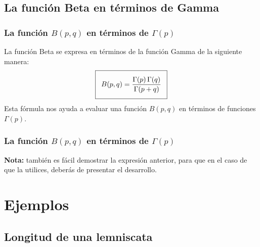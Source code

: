 \documentclass[12pt]{beamer}
\begin{document}
\subsection{La función Beta en términos de Gamma}

\begin{frame}
\frametitle{La función $B(p, q)$ en términos de $\Gamma (p)$}
La función Beta se expresa en términos de la función Gamma de la siguiente manera:
\begin{align}
\addtolength{\fboxsep}{5pt}\boxed{B(p, q) = \dfrac{\Gamma(p) \, \Gamma(q)}{\Gamma (p + q)}}
\label{eq:ecuacion_07_01}
\end{align}
Esta fórmula nos ayuda a evaluar una función $B (p, q)$ en términos de funciones $\Gamma (p)$.
\end{frame}
\begin{frame}
\frametitle{La función $B(p, q)$ en términos de $\Gamma (p)$}
\textbf{Nota: } también es fácil demostrar la expresión anterior, para que en el caso de que la utilices, deberás de presentar el desarrollo.
\end{frame}

\section{Ejemplos}
\subsection{Longitud de una lemniscata}
\end{document}
